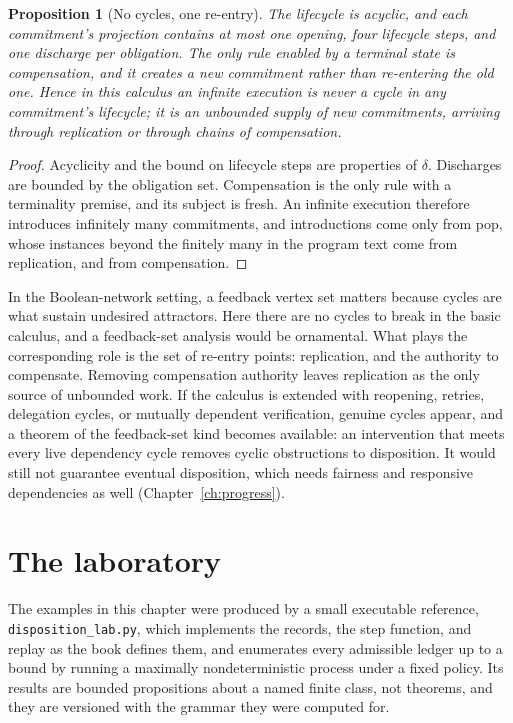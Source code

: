 \documentclass[11pt,openany]{book}
\newtheorem{proposition}[theorem]{Proposition}
\theoremstyle{remark}
\begin{document}
\begin{proposition}[No cycles, one re-entry]\label{prop:reentry}
The lifecycle is acyclic, and each commitment's projection contains at
most one opening, four lifecycle steps, and one discharge per obligation.
The only rule enabled by a terminal state is compensation, and it creates
a new commitment rather than re-entering the old one. Hence in this
calculus an infinite execution is never a cycle in any commitment's
lifecycle; it is an unbounded supply of new commitments, arriving through
replication or through chains of compensation.
\end{proposition}

\begin{proof}
Acyclicity and the bound on lifecycle steps are properties of $\delta$.
Discharges are bounded by the obligation set. Compensation is the only
rule with a terminality premise, and its subject is fresh. An infinite
execution therefore introduces infinitely many commitments, and
introductions come only from pop, whose instances beyond the finitely many
in the program text come from replication, and from compensation.
\end{proof}

In the Boolean-network setting, a feedback vertex set matters because
cycles are what sustain undesired attractors. Here there are no cycles to
break in the basic calculus, and a feedback-set analysis would be
ornamental. What plays the corresponding role is the set of re-entry
points: replication, and the authority to compensate. Removing
compensation authority leaves replication as the only source of unbounded
work. If the calculus is extended with reopening, retries, delegation
cycles, or mutually dependent verification, genuine cycles appear, and a
theorem of the feedback-set kind becomes available: an intervention that
meets every live dependency cycle removes cyclic obstructions to
disposition. It would still not guarantee eventual disposition, which
needs fairness and responsive dependencies as well
(Chapter~\ref{ch:progress}).

\section{The laboratory}
\label{sec:lab}

The examples in this chapter were produced by a small executable
reference, \texttt{disposition\allowbreak\_lab.py}, which implements the records, the
step function, and replay as the book defines them, and enumerates every
admissible ledger up to a bound by running a maximally nondeterministic
process under a fixed policy. Its results are bounded propositions about a
named finite class, not theorems, and they are versioned with the grammar
they were computed for.
\end{document}
